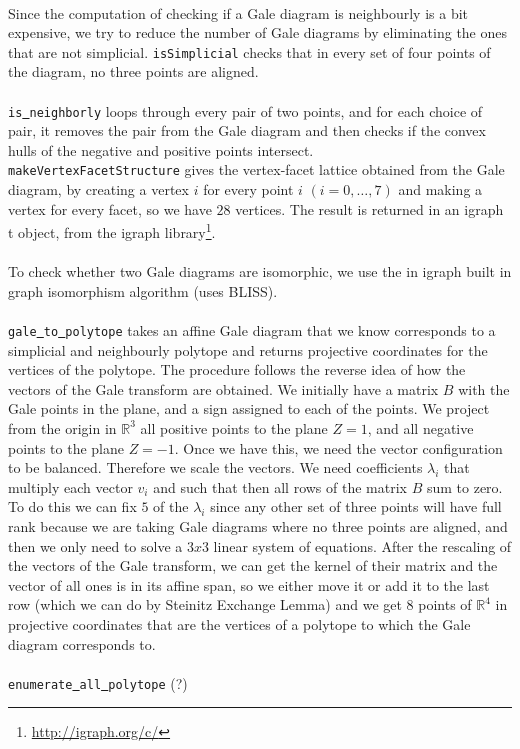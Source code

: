\documentclass[paper=a4, fontsize=11pt]{scrartcl} %
\newcommand{\RR}{{\mathbb R}}
\theoremstyle{definition}
\begin{document}
\\
Since the computation of checking if a Gale diagram is neighbourly is a bit expensive, we try to reduce the number of Gale diagrams by eliminating the ones that are not simplicial. \texttt{isSimplicial} checks that in every set of four points of the diagram, no three points are aligned.\\
\\
\texttt{is\underline{ }neighborly} loops through every pair of two points, and for each choice of pair, it removes the pair from the Gale diagram and then checks if the convex hulls of the negative and positive points intersect.\\

\texttt{makeVertexFacetStructure} gives the vertex-facet lattice obtained from the Gale diagram, by creating a vertex $i$ for every point $i$ $(i=0,\ldots,7)$ and making a vertex for every facet, so we have $28$ vertices. The result is returned in an igraph\underline{ }t object, from the igraph library\footnote{\url{http://igraph.org/c/}}. \\
\\
To check whether two Gale diagrams are isomorphic, we use the in igraph built in graph isomorphism algorithm (uses BLISS).\\
\\
\texttt{gale\underline{ }to\underline{ }polytope} takes an affine Gale diagram that we know corresponds to a simplicial and neighbourly polytope and returns projective coordinates for the vertices of the polytope. The procedure follows the reverse idea of how the vectors of the Gale transform are obtained. We initially have a matrix $B$ with the Gale points in the plane, and a sign assigned to each of the points. We project from the origin in $\RR^3$ all positive points to the plane $Z = 1$, and all negative points to the plane $Z = -1$. Once we have this, we need the vector configuration to be balanced. Therefore we scale the vectors. We need coefficients $\lambda_i$ that multiply each vector $v_i$ and such that then all rows of the matrix $B$ sum to zero. To do this we can fix $5$ of the $\lambda_i$ since any other set of three points will have full rank because we are taking Gale diagrams where no three points are aligned, and then we only need to solve a $3x3$ linear system of equations. After the rescaling of the vectors of the Gale transform, we can get the kernel of their matrix and the vector of all ones is in its affine span, so we either move it or add it to the last row (which we can do by Steinitz Exchange Lemma) and we get 8 points of $\RR^4$ in projective coordinates that are the vertices of a polytope to which the Gale diagram corresponds to.\\
\\
\texttt{enumerate\underline{ }all\underline{ }polytope} (?)
\end{document}
